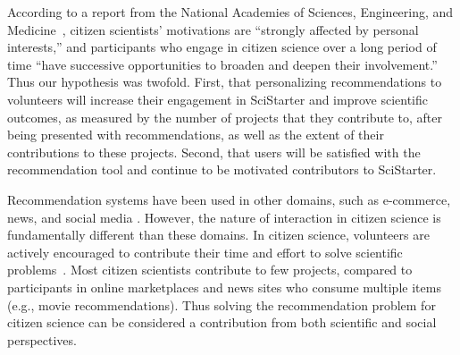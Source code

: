 \documentclass[letterpaper]{article} %
\begin{document}
  According to a report from the National Academies of Sciences, Engineering, and Medicine~\cite{national2018learning}, citizen scientists’ motivations are ``strongly affected by personal interests,” and participants who engage in citizen science over a long period of time ``have successive opportunities to broaden and deepen their involvement.”
 Thus our  hypothesis was  twofold. First, that
 personalizing recommendations  to volunteers
 will increase their engagement in  SciStarter and improve scientific outcomes,   as measured by
 the number of projects that they contribute to, after being presented with  recommendations, as well as  the extent of their contributions to these projects.
 Second, that users will be satisfied with the recommendation tool and continue to be motivated
 contributors to SciStarter.


  Recommendation systems have been used in other  domains, such as e-commerce, news, and  social media \cite{itmazi2006recommendation,fleder2007recommender,kleinerman2020supporting}.  However,
  the nature of interaction in citizen science is fundamentally different  than these domains. In citizen science,
 volunteers  are actively encouraged to contribute their time and effort to solve scientific problems~\cite{cohn2008citizen}.
 Most citizen scientists contribute to  few projects, compared to participants in online marketplaces and news sites who consume multiple items (e.g., movie recommendations).
 Thus solving the recommendation problem for citizen science can be considered a contribution from both scientific and social perspectives.


\end{document}
